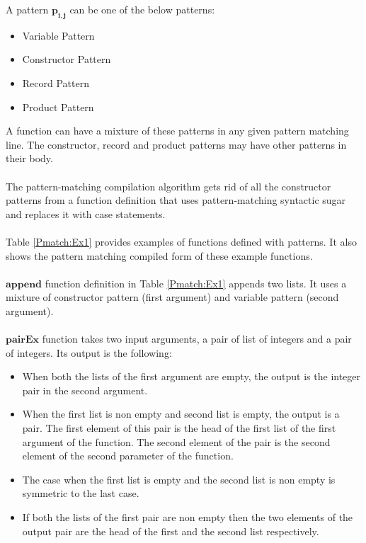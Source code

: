 \documentclass[11pt]{article}
\begin{document}
A pattern $\mathbf{p_{i,j}}$ can be one of the below patterns:
\begin{itemize}
  \item Variable Pattern
  \item Constructor Pattern
  \item Record Pattern
  \item Product Pattern
\end{itemize}
A function can have a mixture of these patterns in any given pattern matching line. The constructor, record and product patterns may have other patterns in their body.
~~\\~~\\
The pattern-matching compilation algorithm gets rid of all the constructor patterns from a function definition that uses pattern-matching syntactic sugar and replaces it with {\sf case} statements. 
~~\\~~\\ 
Table \ref {Pmatch:Ex1} provides examples of functions defined with patterns. It also shows the pattern matching compiled form of these example functions. 
~~\\~~\\
$\mathbf{append}$ function definition in Table \ref {Pmatch:Ex1} appends two lists. It uses a mixture of constructor pattern (first argument) and variable pattern (second argument). 
~~\\~~\\ 
$\mathbf{pairEx}$ function takes two input arguments, a pair of list of integers and a pair of integers. Its output is the following:
\begin{itemize}
  \item When both the lists of the first argument are empty, the output is the integer pair in the second argument.
  \item When the first list is non empty and second list is empty, the output is a pair. The first element of this pair is the head of the first list of the first argument of the function. The second element of the pair is the second element of the second parameter of the function.
  \item The case when the first list is empty and the second list is non empty is symmetric to the last case.
  \item If both the lists of the first pair are non empty then the two elements of the output pair are the head of the first and the second list respectively.
\end{itemize}
\end{document}
